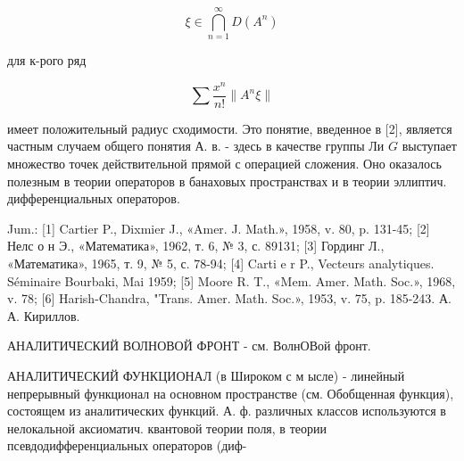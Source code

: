\documentclass[10pt]{article}
\begin{document}
\[

\xi \in \bigcap_{n=1}^{\infty} D\left(A^{n}\right)

\]



для к-рого ряд



\[

\sum \frac{x^{n}}{n !}\left\|A^{n} \xi\right\|

\]



имеет положительный радиус сходимости. Это понятие, введенное в [2], является частным случаем общего понятия А. в. - здесь в качестве группы Ли $G$ выступает множество точек действительной прямой с операцией сложения. Оно оказалось полезным в теории операторов в банаховых пространствах и в теории эллиптич. дифференциальных операторов.



Jum.: [1] Cartier P., Dixmier J., «Amer. J. Math.», 1958, v. 80, p. 131-45; [2] Нелс о н Э., «Математика», 1962, т. 6, № 3, с. 89131; [3] Гординг Л., «Математика», 1965, т. 9, № 5, с. 78-94; [4] Carti e r P., Vecteurs analytiques. Séminaire Bourbaki, Mai 1959; [5] Moore R. T., «Mem. Amer. Math. Soc.», 1968, v. 78; [6] Harish-Chandra, "Trans. Amer. Math. Soc.», 1953, v. 75, p. 185-243. А. А. Кириллов.



АНАЛИТИЧЕСКИЙ ВОЛНОВОЙ ФРОНТ - см. ВолнОВой фронт.



АНАЛИТИЧЕСКИЙ ФУНКЦИОНАЛ (в Широком с м ысле) - линейный непрерывный функционал на основном пространстве (см. Обобщенная функция), состоящем из аналитических функций. А. ф. различных классов используются в нелокальной аксиоматич. квантовой теории поля, в теории псевдодифференциальных операторов (диф-
\end{document}

